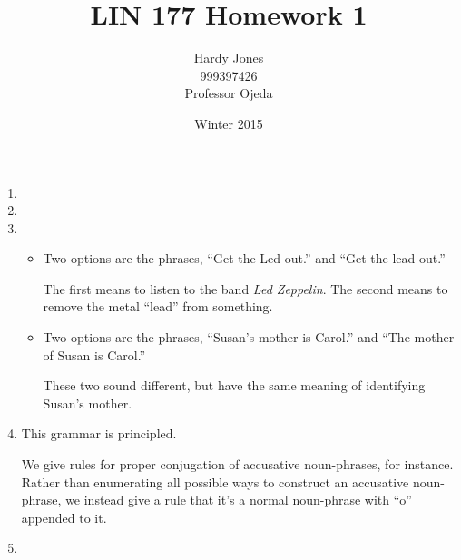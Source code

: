 \documentclass[12pt,letterpaper]{article}
\title{LIN 177 Homework 1\vspace{-2ex}}
\author{Hardy Jones\\
        999397426\\
        Professor Ojeda\vspace{-2ex}}
\date{Winter 2015}
\begin{document}
  \maketitle


  \begin{enumerate}
    \item

    \item

    \item
      \begin{itemize}
        \item
          Two options are the phrases, ``Get the Led out.'' and ``Get the lead out.''

          The first means to listen to the band \textit{Led Zeppelin}.
          The second means to remove the metal ``lead'' from something.

        \item
          Two options are the phrases, ``Susan's mother is Carol.'' and ``The mother of Susan is Carol.''

          These two sound different, but have the same meaning of identifying Susan's mother.
      \end{itemize}

    \pagebreak

    \item

      This grammar is principled.

      We give rules for proper conjugation of accusative noun-phrases, for instance.
      Rather than enumerating all possible ways to construct an accusative noun-phrase,
      we instead give a rule that it's a normal noun-phrase with ``o'' appended to it.

    \item
  \end{enumerate}
\end{document}
